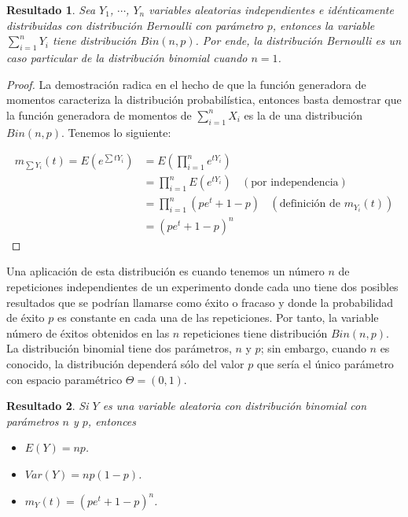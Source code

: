 \documentclass[
  12pt,
  spanish,
]{book}
\providecommand{\tightlist}{%
  \setlength{\itemsep}{0pt}\setlength{\parskip}{0pt}}
\newtheorem{proposition}{Resultado}[chapter]
\theoremstyle{definition}
\theoremstyle{definition}
\theoremstyle{definition}
\theoremstyle{definition}
\theoremstyle{remark}
\begin{document}
\begin{proposition}
\protect\hypertarget{prp:unnamed-chunk-8}{}{\label{prp:unnamed-chunk-8} }Sea \(Y_1\), \(\cdots\), \(Y_n\) variables aleatorias independientes e idénticamente distribuidas con distribución Bernoulli con parámetro \(p\),
entonces la variable \(\sum_{i=1}^nY_i\) tiene distribución \(Bin(n,p)\). Por ende, la distribución Bernoulli es un caso particular de la distribución binomial cuando \(n=1\).
\end{proposition}

\begin{proof}
\iffalse{} {Prueba. } \fi{}La demostración radica en el hecho de que la función generadora de momentos caracteriza la distribución probabilística, entonces basta demostrar que la función generadora de momentos de \(\sum_{i=1}^nX_i\) es la de una distribución \(Bin(n,p)\). Tenemos lo siguiente:

\begin{align*}
m_{\sum Y_i}(t)=E(e^{\sum tY_i})&=E(\prod_{i=1}^ne^{tY_i})\\
               &=\prod_{i=1}^nE(e^{tY_i})\ \ \ \ (\text{por independencia})\\
               &=\prod_{i=1}^n(pe^t+1-p)\ \ \ \ (\text{definición de $m_{Y_i}(t)$})\\
               &=(pe^t+1-p)^n
\end{align*}
\end{proof}

Una aplicación de esta distribución es cuando tenemos un número \(n\) de repeticiones independientes de un experimento donde cada uno tiene dos
posibles resultados que se podrían llamarse como éxito o fracaso y donde la probabilidad de éxito \(p\) es constante en cada una de las repeticiones. Por tanto, la variable número de éxitos obtenidos en las \(n\) repeticiones tiene distribución \(Bin(n,p)\). La distribución binomial tiene dos parámetros, \(n\) y \(p\); sin embargo, cuando \(n\) es conocido, la distribución dependerá sólo del valor \(p\) que sería el único parámetro con espacio paramétrico \(\Theta=(0,1)\).

\begin{proposition}
\protect\hypertarget{prp:unnamed-chunk-10}{}{\label{prp:unnamed-chunk-10} }Si \(Y\) es una variable aleatoria con distribución binomial con parámetros \(n\) y \(p\), entonces

\begin{itemize}
\tightlist
\item
  \(E(Y)=np\).
\item
  \(Var(Y)=np(1-p)\).
\item
  \(m_Y(t)=(pe^t+1-p)^n\).
\end{itemize}
\end{proposition}
\end{document}
